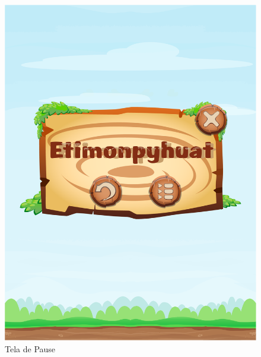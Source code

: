 \documentclass[12pt]{article}
\begin{document}
		\begin{figure}[!htb]
			\centering
			\includegraphics[width=\linewidth]{IMG/pause.png}
			\caption{Tela de Pause}\label{fig:exampleFig11}
			\endminipage \hspace{0.5cm}

\end{figure}
\end{document}
